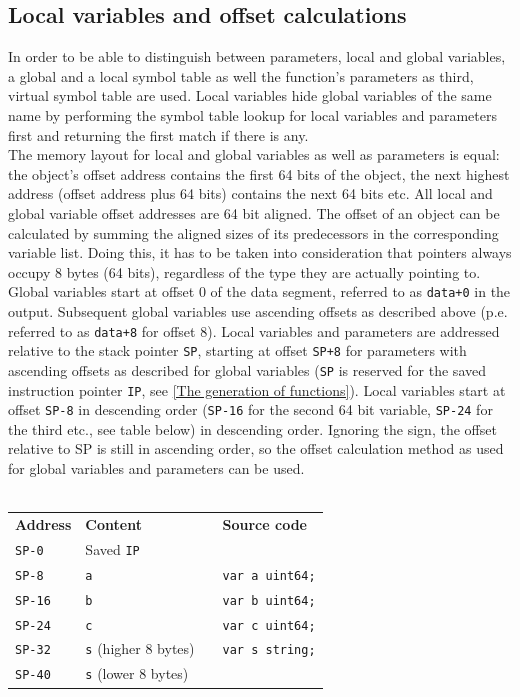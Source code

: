 \documentclass[a4paper]{scrartcl}
\let\section\subsection
\let\subsection\subsubsection
\let\subsubsection\paragraph
\let\paragraph\subparagraph
\let\subparagraph\undefined
\begin{document}
    \section{Local variables and offset calculations}
      In order to be able to distinguish between parameters, local and global variables, a global and a local symbol table as well the function's parameters as third, virtual symbol table are used. Local variables hide global variables of the same name by performing the symbol table lookup for local variables and parameters first and returning the first match if there is any.\\
      The memory layout for local and global variables as well as parameters is equal: the object's offset address contains the first 64 bits of the object, the next highest address (offset address plus 64 bits) contains the next 64 bits etc. All local and global variable offset addresses are 64 bit aligned. The offset of an object can be calculated by summing the aligned sizes of its predecessors in the corresponding variable list. Doing this, it has to be taken into consideration that pointers always occupy 8 bytes (64 bits), regardless of the type they are actually pointing to.\\
      Global variables start at offset 0 of the data segment, referred to as \texttt{data+0} in the output. Subsequent global variables use ascending offsets as described above (p.e. referred to as \texttt{data+8} for offset 8). Local variables and parameters are addressed relative to the stack pointer \texttt{SP}, starting at offset \texttt{SP+8} for parameters with ascending offsets as described for global variables (\texttt{SP} is reserved for the saved instruction pointer \texttt{IP}, see \ref{The generation of functions}). Local variables start at offset \texttt{SP-8} in descending order (\texttt{SP-16} for the second 64 bit variable, \texttt{SP-24} for the third etc., see table below) in descending order. Ignoring the sign, the offset relative to SP is still in ascending order, so the offset calculation method as used for global variables and parameters can be used.\\ \\
      \begin{table}[h]
      \begin{tabular}{llp{2cm}l}
        \cmidrule{1-2}
        \textbf{Address} & \textbf{Content} & & \textbf{Source code}\\
        \cmidrule{1-2}
        \texttt{SP-0} & Saved \texttt{IP} & & \\
        \texttt{SP-8} & \texttt{a} & & \texttt{var a uint64;}\\
        \texttt{SP-16} & \texttt{b} & & \texttt{var b uint64;}\\
        \texttt{SP-24} & \texttt{c} & & \texttt{var c uint64;}\\
        \texttt{SP-32} & \texttt{s} (higher 8 bytes) & & \texttt{var s string;}\\
        \texttt{SP-40} & \texttt{s} (lower 8 bytes) & & \\
        \cmidrule{1-2}
      \end{tabular}
      \end{table}\\ \\
\end{document}
